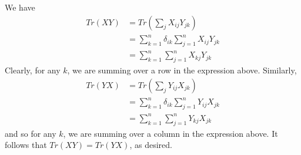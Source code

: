 \documentclass[12pt,onecolumn]{article}
\begin{document}
\begin{answer}
We have
\begin{align*}
    Tr(XY) &= Tr(\sum_j X_{ij}Y_{jk}) \\
    &= \sum_{k=1}^n \delta_{ik}\sum_{j=1}^n X_{ij}Y_{jk} \\
    &= \sum_{k=1}^n\sum_{j=1}^n  X_{kj}Y_{jk}
\end{align*}
Clearly, for any $k$, we are summing over a row in the expression above. Similarly,
\begin{align*}
    Tr(YX) &= Tr(\sum_j Y_{ij}X_{jk}) \\
    &= \sum_{k=1}^n \delta_{ik}\sum_{j=1}^n Y_{ij}X_{jk} \\
    &= \sum_{k=1}^n\sum_{j=1}^n  Y_{kj}X_{jk}
\end{align*}
and so for any $k$, we are summing over a column in the expression above. It follows that $Tr(XY)=Tr(YX)$, as desired.
\end{answer}
\end{document}
